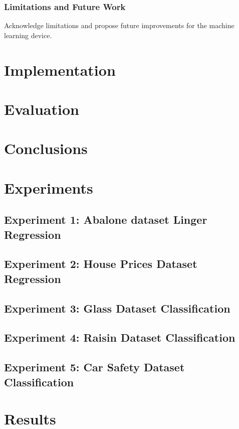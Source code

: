\documentclass[a4paper, 12pt]{report}
\begin{document}
\subsection{Limitations and Future Work}
Acknowledge limitations and propose future improvements for the machine learning device.


\chapter{Implementation}
\label{ch:Implementation}

\chapter{Evaluation}
\label{ch:Evaluation}

\chapter{Conclusions}
\label{ch:Conclusions}

\chapter{Experiments}
\label{ch:Experimnents}

\section{Experiment 1: Abalone dataset Linger Regression}

\section{Experiment 2: House Prices Dataset Regression}

\section{Experiment 3: Glass Dataset Classification}

\section{Experiment 4: Raisin Dataset Classification}

\section{Experiment 5: Car Safety Dataset Classification}

\chapter{Results}
\label{ch:Results}


\end{document}
